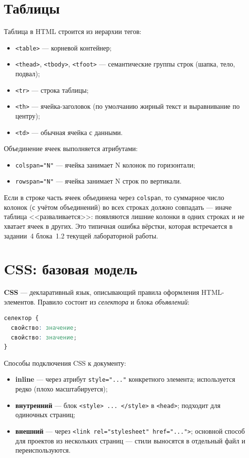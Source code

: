 \section{Таблицы}

Таблица в HTML строится из иерархии тегов:
\begin{itemize}
  \item \texttt{<table>} --- корневой контейнер;
  \item \texttt{<thead>}, \texttt{<tbody>}, \texttt{<tfoot>} ---
        семантические группы строк (шапка, тело, подвал);
  \item \texttt{<tr>} --- строка таблицы;
  \item \texttt{<th>} --- ячейка-заголовок (по умолчанию жирный
        текст и выравнивание по центру);
  \item \texttt{<td>} --- обычная ячейка с данными.
\end{itemize}

Объединение ячеек выполняется атрибутами:
\begin{itemize}
  \item \texttt{colspan="N"} --- ячейка занимает N колонок по
        горизонтали;
  \item \texttt{rowspan="N"} --- ячейка занимает N строк по
        вертикали.
\end{itemize}

Если в строке часть ячеек объединена через \texttt{colspan}, то
суммарное число колонок (с учётом объединений) во всех строках
должно совпадать --- иначе таблица <<разваливается>>: появляются
лишние колонки в одних строках и не хватает ячеек в других. Это
типичная ошибка вёрстки, которая встречается в задании~4 блока~1.2
текущей лабораторной работы.

\section{CSS: базовая модель}

\textbf{CSS} --- декларативный язык, описывающий правила оформления
HTML-элементов. Правило состоит из \emph{селектора} и блока
\emph{объявлений}:
\begin{lstlisting}[language=CSS]
селектор {
  свойство: значение;
  свойство: значение;
}
\end{lstlisting}

Способы подключения CSS к документу:
\begin{itemize}
  \item \textbf{inline} --- через атрибут \texttt{style="..."}
        конкретного элемента; используется редко (плохо
        масштабируется);
  \item \textbf{внутренний} --- блок \texttt{<style>~...~</style>}
        в \texttt{<head>}; подходит для одиночных страниц;
  \item \textbf{внешний} --- через
        \texttt{<link~rel="stylesheet"~href="...">}; основной способ
        для проектов из нескольких страниц --- стили выносятся в
        отдельный файл и переиспользуются.
\end{itemize}

